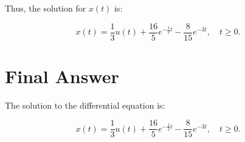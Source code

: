 \documentclass{article}
\begin{document}
Thus, the solution for \(x(t)\) is:

\[
x(t) = \frac{1}{3}u(t) + \frac{16}{5}e^{-\frac{1}{2}t} - \frac{8}{15}e^{-3t}, \quad t \geq 0.
\]

\section*{Final Answer}

The solution to the differential equation is:

\[
x(t) = \frac{1}{3}u(t) + \frac{16}{5}e^{-\frac{1}{2}t} - \frac{8}{15}e^{-3t}, \quad t \geq 0.
\]
\end{document}
